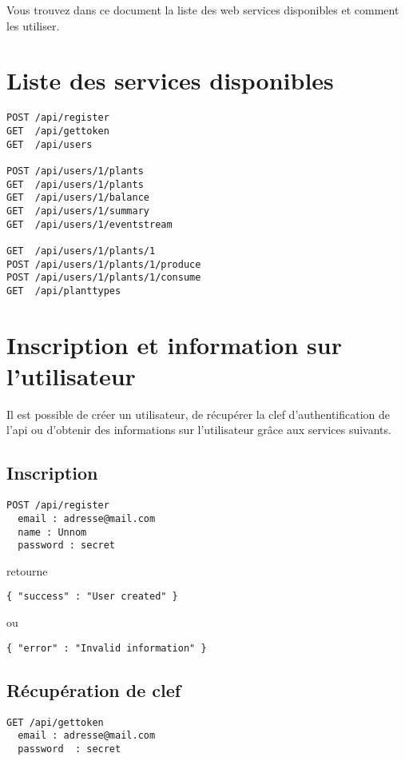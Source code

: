 
Vous trouvez dans ce document la liste des web services disponibles et comment les utiliser.

\section{Liste des services disponibles}

\begin{lstlisting}
POST /api/register
GET  /api/gettoken 
GET  /api/users

POST /api/users/1/plants
GET  /api/users/1/plants
GET  /api/users/1/balance
GET  /api/users/1/summary
GET  /api/users/1/eventstream

GET  /api/users/1/plants/1
POST /api/users/1/plants/1/produce
POST /api/users/1/plants/1/consume
GET  /api/planttypes
\end{lstlisting}


\section{Inscription et information sur l'utilisateur}
Il est possible de créer un utilisateur, de récupérer la clef d'authentification de l'api
ou d'obtenir des informations sur l'utilisateur grâce aux services suivants.

\subsection{Inscription}

\begin{lstlisting}
POST /api/register 
  email : adresse@mail.com
  name : Unnom
  password : secret
\end{lstlisting}

retourne

\begin{lstlisting}
{ "success" : "User created" }
\end{lstlisting}
 
ou 

\begin{lstlisting}
{ "error" : "Invalid information" }
\end{lstlisting}

\subsection{Récupération de clef}

\begin{lstlisting}
GET /api/gettoken 
  email : adresse@mail.com
  password  : secret
\end{lstlisting}

